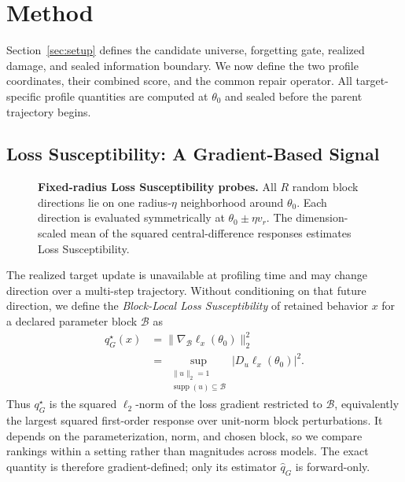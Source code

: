 \section{Method}
\label{sec:method}

Section~\ref{sec:setup} defines the candidate universe, forgetting gate,
realized damage, and sealed information boundary. We now define the two
profile coordinates, their combined score, and the common repair operator.
All target-specific profile quantities are computed at $\theta_0$ and sealed
before the parent trajectory begins.

\subsection{Loss Susceptibility: A Gradient-Based Signal}
\label{sec:method-loss-susceptibility}
\label{sec:method-profile}

\begin{figure}[!t]
\centering

\caption{\textbf{Fixed-radius Loss Susceptibility probes.}
All $R$ random block directions lie on one radius-$\eta$ neighborhood around
$\theta_0$. Each direction is evaluated symmetrically at
$\theta_0\pm\eta v_r$. The dimension-scaled mean of the squared
central-difference responses estimates Loss Susceptibility.}
\label{fig:loss-susceptibility-geometry}
\end{figure}

The realized target update is unavailable at profiling time and may change
direction over a multi-step trajectory. Without conditioning on that future
direction, we define the \emph{Block-Local Loss Susceptibility} of retained
behavior $x$ for a declared parameter block $\mathcal B$ as
\begin{equation}
  \begin{aligned}
  q_G^\star(x)
  &=\|\nabla_{\mathcal B}\ell_x(\theta_0)\|_2^2 \\
  &=\sup_{\substack{\|u\|_2=1\\
       \operatorname{supp}(u)\subseteq\mathcal B}}
       |D_u\ell_x(\theta_0)|^2 .
  \end{aligned}
  \label{eq:block-local-loss-susceptibility}
\end{equation}
Thus $q_G^\star$ is the squared $\ell_2$-norm of the loss gradient restricted
to $\mathcal B$, equivalently the largest squared first-order response over
unit-norm block perturbations. It depends on the parameterization, norm, and
chosen block, so we compare rankings within a setting rather than magnitudes
across models. The exact quantity is therefore gradient-defined; only its
estimator $\widehat q_G$ is forward-only.

